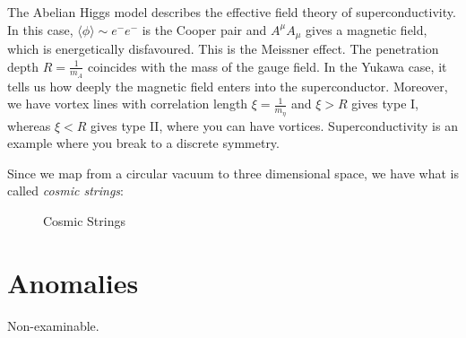
The Abelian Higgs model describes the effective field theory of superconductivity.
In this case, $\langle \phi \rangle \sim e^- e^-$ is the Cooper pair and $A^{\mu} A_{\mu}$ gives a magnetic field, which is energetically disfavoured.  This is the Meissner effect.
The penetration depth $R = \frac{1}{m_A}$ coincides with the mass of the gauge field.
In the Yukawa case, it tells us how deeply the magnetic field enters into the superconductor.
Moreover, we have vortex lines with correlation length $\xi = \frac{1}{m_{\eta}}$ and $\xi >R$ gives type I, whereas $\xi < R$ gives type II, where you can have vortices.
Superconductivity is an example where you break to a discrete symmetry.

Since we map from a circular vacuum to three dimensional space, we have what is called \emph{cosmic strings}:
\begin{figure}[ht]
    \centering
    \caption{Cosmic Strings}
    \label{fig:cosmic-strings}
\end{figure}

\section{Anomalies}%
\label{sec:anomalies}

\begin{leftbar}
  Non-examinable.
\end{leftbar}


